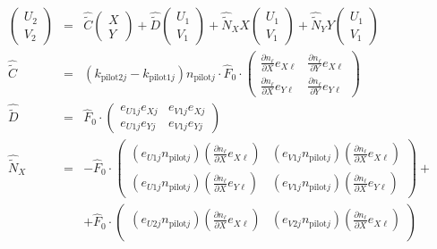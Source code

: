 \documentclass[12pt,a4paper,twoside,openright,BCOR10mm,headsepline,titlepage,abstracton,chapterprefix,final]{scrreprt}
\newcommand\wavenumber{k}
\newcommand\pilot{\textrm{pilot}}
\begin{document}
\begin{eqnarray}
 \begin{pmatrix} U_2 \\ V_2 \end{pmatrix}
 &=&
    \hat{\tilde{C}}     \begin{pmatrix} X   \\ Y   \end{pmatrix}  
  + \hat{\tilde{D}}     \begin{pmatrix} U_1 \\ V_1 \end{pmatrix}
  + \hat{\tilde{N}}_X X \begin{pmatrix} U_1 \\ V_1 \end{pmatrix}
  + \hat{\tilde{N}}_Y Y \begin{pmatrix} U_1 \\ V_1 \end{pmatrix}
  \\
  \hat{\tilde{C}} 
  &=&
     (\wavenumber_{\pilot 2 j} - \wavenumber_{\pilot 1 j}) n_{\pilot j}
     \cdot \hat{F}_0 \cdot
     \begin{pmatrix}
       \frac{\partial n_\ell}{\partial X} e_{X\ell} & \frac{\partial n_\ell}{\partial Y} e_{X\ell} 
       \\    
       \frac{\partial n_\ell}{\partial X} e_{Y\ell} & \frac{\partial n_\ell}{\partial Y} e_{Y\ell}
     \end{pmatrix} 
  \\
  \hat{\tilde{D}}
  &=&
     \hat{F}_0 \cdot
     \begin{pmatrix}
       e_{U1j} e_{Xj} &  e_{V1j} e_{Xj}
       \\
       e_{U1j} e_{Yj} &  e_{V1j} e_{Yj}
     \end{pmatrix}
  \\
  \hat{\tilde{N}}_X
  &=& - \hat{F}_0\cdot
     \begin{pmatrix}
       (e_{U1j} n_{\pilot j}) (\frac{\partial n_\ell}{\partial X} e_{X\ell}) &  (e_{V1j} n_{\pilot j}) (\frac{\partial n_\ell}{\partial X} e_{X\ell}) \\
       (e_{U1j} n_{\pilot j}) (\frac{\partial n_\ell}{\partial X} e_{Y\ell}) &  (e_{V1j} n_{\pilot j}) (\frac{\partial n_\ell}{\partial X} e_{Y\ell})
     \end{pmatrix} +
  \nonumber\\
  &&+ \hat{F}_0 \cdot
     \begin{pmatrix}
       (e_{U2j} n_{\pilot j}) (\frac{\partial n_\ell}{\partial X} e_{X\ell}) &  (e_{V2j} n_{\pilot j}) (\frac{\partial n_\ell}{\partial X} e_{X\ell}) \\

\end{pmatrix}
\end{eqnarray}
\end{document}
